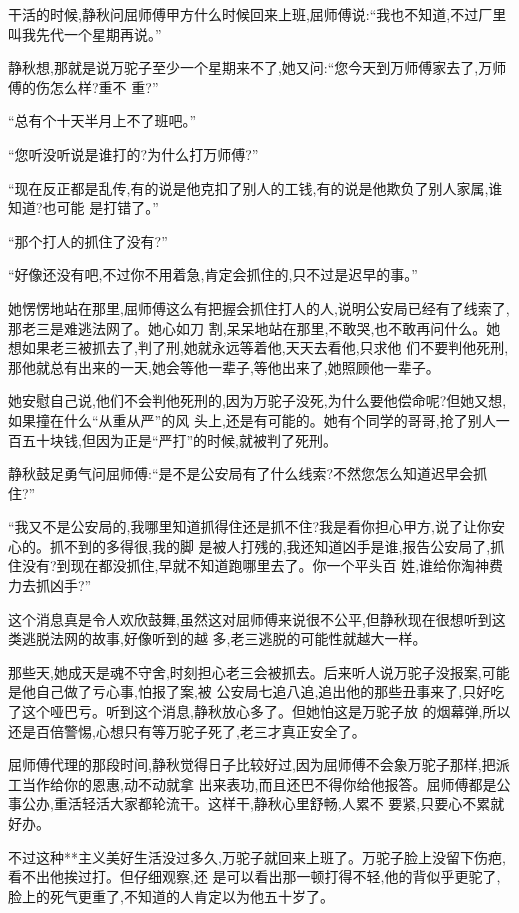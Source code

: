﻿\documentclass[12pt]{article}
\begin{document}
干活的时候,静秋问屈师傅甲方什么时候回来上班,屈师傅说:``我也不知道,不过厂里叫我先代一个星期再说。''

静秋想,那就是说万驼子至少一个星期来不了,她又问:``您今天到万师傅家去了,万师傅\myrule 的伤怎么样?重不
重?''

``总有个十天半月上不了班吧。''

``您听没听说是\myrule 谁打的?为什么打\myrule 万师傅?''

``现在反正都是乱传,有的说是他克扣了别人的工钱,有的说是\myrule 他欺负了别人家属\myrule ,谁知道?也可能
是打错了。''

``那个\myrule 打人的抓住了没有?''

``好像还没有吧,不过你不用着急,肯定会抓住的,只不过是迟早的事。''

她愣愣地站在那里,屈师傅这么有把握会抓住打人的人,说明公安局已经有了线索了,那老三是难逃法网了。她心如刀
割,呆呆地站在那里,不敢哭,也不敢再问什么。她想如果老三被抓去了,判了刑,她就永远等着他,天天去看他,只求他
们不要判他死刑,那他就总有出来的一天,她会等他一辈子,等他出来了,她照顾他一辈子。

她安慰自己说,他们不会判他死刑的,因为万驼子没死,为什么要他偿命呢?但她又想,如果撞在什么``从重从严''的风
头上,还是有可能的。她有个同学的哥哥,抢了别人一百五十块钱,但因为正是``严打''的时候,就被判了死刑。

静秋鼓足勇气问屈师傅:``是不是\myrule 公安局有了什么线索?不然您怎么知道迟早会抓住?''

``我又不是公安局的,我哪里知道抓得住还是抓不住?我是看你担心甲方,说了让你安心的。抓不到的多得很,我的脚
是被人打残的,我还知道凶手是谁,报告公安局了,抓住没有?到现在都没抓住,早就不知道跑哪里去了。你一个平头百
姓,谁给你淘神费力去抓凶手?''

这个消息真是令人欢欣鼓舞,虽然这对屈师傅来说很不公平,但静秋现在很想听到这类逃脱法网的故事,好像听到的越
多,老三逃脱的可能性就越大一样。

那些天,她成天是魂不守舍,时刻担心老三会被抓去。后来听人说万驼子没报案,可能是他自己做了亏心事,怕报了案,被
公安局七追八追,追出他的那些丑事来了,只好吃了这个哑巴亏。听到这个消息,静秋放心多了。但她怕这是万驼子放
的烟幕弹,所以还是百倍警惕,心想只有等万驼子死了,老三才真正安全了。

屈师傅代理的那段时间,静秋觉得日子比较好过,因为屈师傅不会象万驼子那样,把派工当作给你的恩惠,动不动就拿
出来表功,而且还巴不得你给他报答。屈师傅都是公事公办,重活轻活大家都轮流干。这样干,静秋心里舒畅,人累不
要紧,只要心不累就好办。

不过这种**主义美好生活没过多久,万驼子就回来上班了。万驼子脸上没留下伤疤,看不出他挨过打。但仔细观察,还
是可以看出那一顿打得不轻,他的背似乎更驼了,脸上的死气更重了,不知道的人肯定以为他五十岁了。
\end{document}
